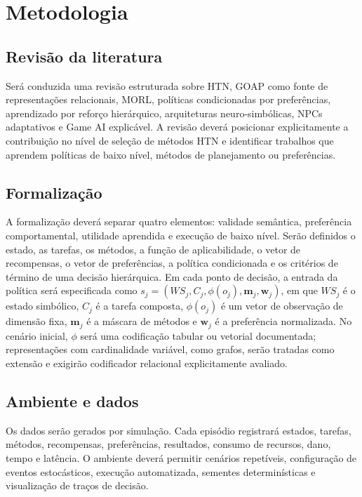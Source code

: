 \chapter{Metodologia}

\section{Revisão da literatura}

Será conduzida uma revisão estruturada sobre HTN, GOAP como fonte de
representações relacionais, MORL, políticas condicionadas por preferências,
aprendizado por reforço hierárquico, arquiteturas neuro-simbólicas, NPCs
adaptativos e Game AI explicável.
A revisão deverá posicionar explicitamente a contribuição no nível de seleção
de métodos HTN e identificar trabalhos que aprendem políticas de baixo nível,
métodos de planejamento ou preferências.

\section{Formalização}

A formalização deverá separar quatro elementos: validade semântica,
preferência comportamental, utilidade aprendida e execução de baixo nível.
Serão definidos o estado, as tarefas, os métodos, a função de aplicabilidade, o
vetor de recompensas, o vetor de preferências, a política condicionada e os
critérios de término de uma decisão hierárquica.
Em cada ponto de decisão, a entrada da política será especificada como
$s_j=(WS_j,C_j,\phi(o_j),\mathbf{m}_j,\mathbf{w}_j)$, em que $WS_j$ é o
estado simbólico, $C_j$ é a tarefa composta, $\phi(o_j)$ é um vetor de
observação de dimensão fixa, $\mathbf{m}_j$ é a máscara de métodos e
$\mathbf{w}_j$ é a preferência normalizada. No cenário inicial,
$\phi$ será uma codificação tabular ou vetorial documentada; representações
com cardinalidade variável, como grafos, serão tratadas como extensão e
exigirão codificador relacional explicitamente avaliado.

\section{Ambiente e dados}

Os dados serão gerados por simulação.
Cada episódio registrará estados, tarefas, métodos, recompensas, preferências,
resultados, consumo de recursos, dano, tempo e latência.
O ambiente deverá permitir cenários repetíveis, configuração de eventos estocásticos,
execução automatizada, sementes determinísticas e visualização de traços de decisão.

